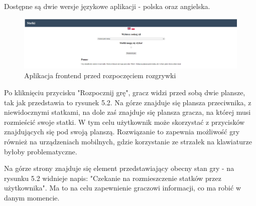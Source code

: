 Dostępne są dwie wersje językowe aplikacji - polska oraz angielska.

\begin{figure}[!h]
    \label{fig:frontend-start}
    \centering \includegraphics[width=1\linewidth]{img/frontend-start.PNG}
    \caption{Aplikacja frontend przed rozpoczęciem rozgrywki}
\end{figure}

Po kliknięciu przycisku "Rozpocznij grę", gracz widzi przed sobą dwie plansze, tak jak przedstawia to rysunek 5.2. Na górze znajduje się plansza przeciwnika, z niewidocznymi statkami, na dole zaś znajduje się plansza gracza, na której musi rozmieścić swoje statki. W tym celu użytkownik może skorzystać z przycisków znajdujących się pod swoją planszą. Rozwiązanie to zapewnia możliwość gry również na urządzeniach mobilnych, gdzie korzystanie ze strzałek na klawiaturze byłoby problematyczne.

\indent Na górze strony znajduje się element przedstawiający obecny stan gry - na rysunku 5.2 widnieje napis: "Czekanie na rozmieszczenie statków przez użytkownika". Ma to na celu zapewnienie graczowi informacji, co ma robić w danym momencie.

